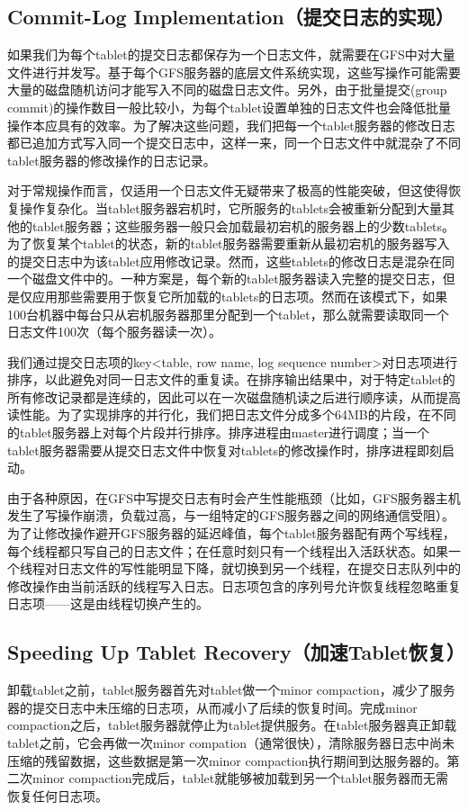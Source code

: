 \documentclass{article}
\begin{document}
\subsection{Commit-Log Implementation（提交日志的实现）}
如果我们为每个tablet的提交日志都保存为一个日志文件，就需要在GFS中对大量文件进行并发写。基于每个GFS服务器的底层文件系统实现，这些写操作可能需要大量的磁盘随机访问才能写入不同的磁盘日志文件。另外，由于批量提交(group commit)的操作数目一般比较小，为每个tablet设置单独的日志文件也会降低批量操作本应具有的效率。为了解决这些问题，我们把每一个tablet服务器的修改日志都已追加方式写入同一个提交日志中，这样一来，同一个日志文件中就混杂了不同tablet服务器的修改操作的日志记录。\par
对于常规操作而言，仅适用一个日志文件无疑带来了极高的性能突破，但这使得恢复操作复杂化。当tablet服务器宕机时，它所服务的tablets会被重新分配到大量其他的tablet服务器；这些服务器一般只会加载最初宕机的服务器上的少数tablets。为了恢复某个tablet的状态，新的tablet服务器需要重新从最初宕机的服务器写入的提交日志中为该tablet应用修改记录。然而，这些tablets的修改日志是混杂在同一个磁盘文件中的。一种方案是，每个新的tablet服务器读入完整的提交日志，但是仅应用那些需要用于恢复它所加载的tablets的日志项。然而在该模式下，如果100台机器中每台只从宕机服务器那里分配到一个tablet，那么就需要读取同一个日志文件100次（每个服务器读一次）。\par
我们通过提交日志项的key<table, row name, log sequence number>对日志项进行排序，以此避免对同一日志文件的重复读。在排序输出结果中，对于特定tablet的所有修改记录都是连续的，因此可以在一次磁盘随机读之后进行顺序读，从而提高读性能。为了实现排序的并行化，我们把日志文件分成多个64MB的片段，在不同的tablet服务器上对每个片段并行排序。排序进程由master进行调度；当一个tablet服务器需要从提交日志文件中恢复对tablets的修改操作时，排序进程即刻启动。\par
由于各种原因，在GFS中写提交日志有时会产生性能瓶颈（比如，GFS服务器主机发生了写操作崩溃，负载过高，与一组特定的GFS服务器之间的网络通信受阻）。为了让修改操作避开GFS服务器的延迟峰值，每个tablet服务器配有两个写线程，每个线程都只写自己的日志文件；在任意时刻只有一个线程出入活跃状态。如果一个线程对日志文件的写性能明显下降，就切换到另一个线程，在提交日志队列中的修改操作由当前活跃的线程写入日志。日志项包含的序列号允许恢复线程忽略重复日志项——这是由线程切换产生的。

\subsection{Speeding Up Tablet Recovery（加速Tablet恢复）}
卸载tablet之前，tablet服务器首先对tablet做一个minor compaction，减少了服务器的提交日志中未压缩的日志项，从而减小了后续的恢复时间。完成minor compaction之后，tablet服务器就停止为tablet提供服务。在tablet服务器真正卸载tablet之前，它会再做一次minor compation（通常很快），清除服务器日志中尚未压缩的残留数据，这些数据是第一次minor compaction执行期间到达服务器的。第二次minor compaction完成后，tablet就能够被加载到另一个tablet服务器而无需恢复任何日志项。\par
\end{document}
